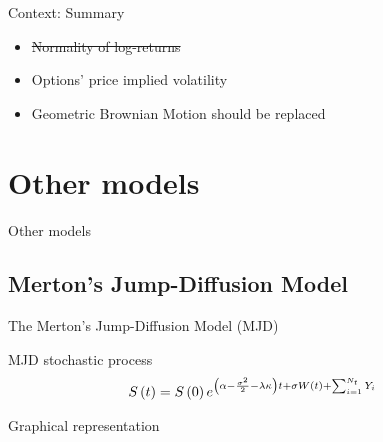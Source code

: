 \documentclass{beamer}
\newcommand{\Bm}{W\left(t\right)}
\newcommand{\St}{S\left(t\right)}
\newcommand{\BSM}{Black--Scholes--Merton }
\begin{document}
\begin{frame}{Context: Summary}
  
  \begin{itemize}
    \item \sout{Normality of log-returns}
    \item Options' price implied volatility
    \item Geometric Brownian Motion should be replaced
  \end{itemize} 

  
\end{frame}

\section{Other models}


\begin{frame}{Other models}

\tableofcontents[currentsection]
 
\end{frame}





\subsection{Merton's Jump-Diffusion Model}
\begin{frame}{The Merton's Jump-Diffusion Model (MJD)}

\begin{block}{MJD stochastic process}
  \begin{align}
  \St &= S\left(0\right) e^{\left(\alpha - \frac{\sigma^2}{2} - \lambda \kappa\right) t + \sigma \Bm + \sum_{i=1}^{N_t} Y_i}
  \notag
\end{align}
  
\end{block}


\begin{block}{Graphical representation}
  \begin{figure}[ht]
  \centering
   
\end{figure}
  
\end{block}
 
\end{frame}
\end{document}
